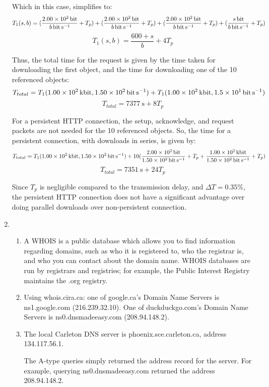 \documentclass{article}
\begin{document}
\begin{enumerate}
Which in this case, simplifies to:
$$ T_1(s,b) = (\frac{\SI{200}{\bit}}{\SI[parse-numbers = false]{b}{\bit\per\second}} + T_p) + (\frac{\SI{200}{\bit}}{\SI[parse-numbers = false]{b}{\bit\per\second}} + T_p) + (\frac{\SI{200}{\bit}}{\SI[parse-numbers = false]{b}{\bit\per\second}} + T_p) + (\frac{\SI[parse-numbers = false]{s}{\bit}}{\SI[parse-numbers = false]{b}{\bit\per\second}} + T_p) $$
$$ T_1(s,b) = \frac{600 + s}{b} + 4T_p $$

Thus, the total time for the request is given by the time taken for downloading the first object, and the time for downloading one of the 10 referenced objects:
$$ T_{total} = T_1(\SI{100}{\kilo\bit}, \SI{150}{\bit\per\second}) + T_1(\SI{100}{\kilo\bit}, \SI{15}{\bit\per\second}) $$
$$ T_{total} = \SI{7377}{\second} + 8T_p $$

For a persistent HTTP connection, the setup, acknowledge, and request packets are not needed for the 10 referenced objects. So, the time for a persistent connection, with downloads in series, is given by:
$$ T_{total} = T_1(\SI{100}{\kilo\bit}, \SI{150}{\bit\per\second}) + 10(\frac{\SI{200}{\bit}}{\SI{150}{\bit\per\second}} + T_p + \frac{\SI{100}{\kilo\bit}}{\SI{150}{\bit\per\second}} + T_p) $$
$$ T_{total} = \SI{7351}{\second} + 24T_p $$

Since $ T_p $ is negligible compared to the transmission delay, and $ \Delta T = 0.35\% $, the persistent HTTP connection does not have a significant advantage over doing parallel downloads over non-persistent connection.

\item
\begin{enumerate}

\item A WHOIS is a public database which allows you to find information regarding domains, such as who it is registered to, who the registrar is, and who you can contact about the domain name. WHOIS databases are run by registrars and registries; for example, the Public Interest Registry maintains the .org registry.

\item Using whois.cira.ca: one of google.ca's Domain Name Servers is ns1.google.com (216.239.32.10). One of duckduckgo.com's Domain Name Servers is ns0.dnsmadeeasy.com (208.94.148.2).

\item The local Carleton DNS server is phoenix.sce.carleton.ca, address 134.117.56.1.

The A-type queries simply returned the address record for the server. For example, querying ns0.dnsmadeeasy.com returned the address 208.94.148.2.


\end{enumerate}
\end{enumerate}
\end{document}
